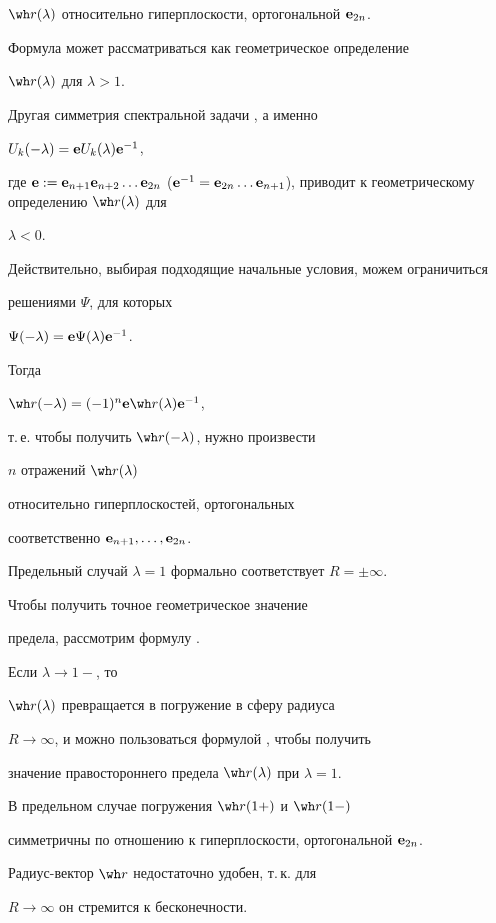${\wh r}(\lambda)$ относительно гиперплоскости, ортогональной $\bold e_{2n}$.


Формула  может рассматриваться как геометрическое определение


${\wh r} (\lambda)$ для $\lambda > 1$.


Другая симметрия спектральной задачи , а именно


$U_k (-\lambda) = \bold e U_k (\lambda) \bold e^{-1}$,


где $\e : = \e_{n+1} \e_{n+2} \dotsc \e_{2n}$ ($\e^{-1} = \e_{2n}\dotsc 


\e_{n+1}$), приводит к геометрическому определению ${\wh r} (\lambda)$ для


$\lambda < 0$.


Действительно, выбирая подходящие начальные условия, можем ограничиться


решениями $\Psi$, для которых


$\Psi (- \lambda) = \bold e \Psi (\lambda) \bold e^{-1}$.


Тогда


${\wh r} ( - \lambda) = (-1)^n \e {\wh r} (\lambda) \e^{-1}$,


т.\,е. чтобы получить ${\wh r} ( -\lambda)$, нужно произвести


$n$ отражений ${\wh r} (\lambda)$


относительно гиперплоскостей, ортогональных


соответственно $\bold e_{n+1},\dotsc,\bold e_{2n}$.


Предельный случай $\lambda=1$ формально соответствует $R=\pm \infty$.


Чтобы получить точное геометрическое значение


предела, рассмотрим формулу .


Если $\lambda \rightarrow 1-$, то


${\wh r} (\lambda)$ превращается в погружение в сферу радиуса


$R \rightarrow \infty$, и можно пользоваться формулой , чтобы получить


значение правостороннего предела ${\wh r} (\lambda)$ при $\lambda=1$.


В предельном случае погружения ${\wh r} (1+)$ и ${\wh r} (1-)$


симметричны по отношению к гиперплоскости, ортогональной $\bold e_{2n}$.


Радиус-вектор ${\wh r}$ недостаточно удобен, т.\,к. для


$R \rightarrow \infty$ он стремится к бесконечности.


